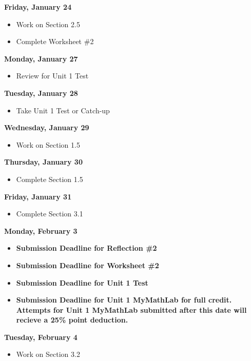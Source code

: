 \documentclass[11pt]{article}
\begin{document}
\textbf{Friday, January 24}

\begin{itemize}
\item Work on Section 2.5
\item Complete Worksheet \#2
\end{itemize}

\textbf{Monday, January 27}

\begin{itemize}
\item Review for Unit 1 Test
\end{itemize}

\textbf{Tuesday, January 28}

\begin{itemize}
\item Take Unit 1 Test or Catch-up
\end{itemize}

\textbf{Wednesday, January 29}

\begin{itemize}
\item Work on Section 1.5
\end{itemize}

\textbf{Thursday, January 30}

\begin{itemize}
\item Complete Section 1.5
\end{itemize}

\textbf{Friday, January 31}

\begin{itemize}
\item Complete Section 3.1
\end{itemize}

\textbf{Monday, February 3}

\begin{itemize}
\item \textbf{Submission Deadline for Reflection \#2}
\item \textbf{Submission Deadline for Worksheet \#2}
\item \textbf{Submission Deadline for Unit 1 Test}
\item \textbf{Submission Deadline for Unit 1 MyMathLab for full credit. Attempts for Unit 1 MyMathLab submitted after this date will recieve a 25\% point deduction.}
\end{itemize}

\textbf{Tuesday, February 4}

\begin{itemize}
\item Work on Section 3.2
\end{itemize}
\end{document}
